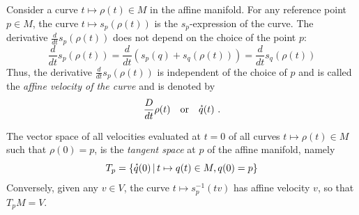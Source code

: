 \documentclass[axioms,article,submit,pdftex,moreauthors]{Definitions/mdpi}
\theoremstyle{plain}
\theoremstyle{remark}
\newcommand{\Derivby}[1]{\frac{D}{d#1}}
\newcommand{\setof}[2]{\left\{#1 \, \middle| \, #2 \right\}}
\newcommand{\velocity}[1]{\accentset{\star}{#1}}
\begin{document}
Consider a curve \( t \mapsto \rho(t) \in M \) in the affine manifold. For any reference point \( p \in M \), the curve \( t \mapsto s_p(\rho(t)) \) is the $s_p$-expression of the curve. The derivative $
\frac{d}{dt} s_p(\rho(t))$ does not depend on the choice of the point \( p \):
\begin{equation*} 
\frac{d}{dt} s_p(\rho(t)) = \frac{d}{dt} \left( s_p(q) + s_q(\rho(t)) \right) = \frac{d}{dt} s_q(\rho(t))
\end{equation*} 
Thus, the derivative \( \displaystyle \frac{d}{dt} s_p(\rho(t)) \) is independent of the choice of \( p \) and is called the \emph{affine velocity of the curve} and is denoted by
\begin{equation*}
\Derivby t \rho(t) \quad \text{or} \quad \velocity q(t) \ .
\end{equation*}

The vector space of all velocities evaluated at $t = 0$ of all curves $t \mapsto \rho(t) \in M$ such that $\rho(0) = p$, is the \emph{tangent space} at $p$ of the affine manifold, namely
\begin{equation}
    T_p = \setof{\velocity q(0)}{t \mapsto q(t) \in M, q(0) = p}
\end{equation}
Conversely, given any $v \in V$, the curve $t \mapsto s_p^{-1}(tv)$ has affine velocity $v$, so that $T_p M = V$.
\end{document}
